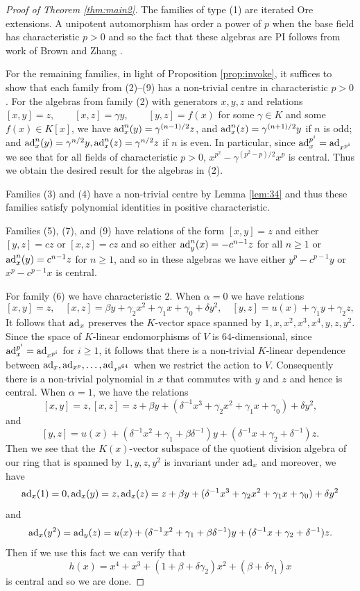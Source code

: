 \documentclass[a4paper,11pt,twoside,notitlepage,reqno]{amsart}
\theoremstyle{plain}
\numberwithin{thm}{section}
\theoremstyle{definition}
\begin{document}
\begin{proof}[Proof of Theorem \ref{thm:main2}]

The families of type (1) are iterated Ore extensions.  A unipotent automorphism has order a power of $p$ when the base field has characteristic $p>0$ and so the fact that these algebras are PI follows from work of Brown and Zhang \cite[Theorem 3.3]{BZ}. 

For the remaining families, in light of Proposition \ref{prop:invoke}, it suffices to show that each family from (2)--(9) has a non-trivial centre in characteristic $p>0$.
For the algebras from family (2) with generators $x,y,z$ and relations $[x,y]=z, \qquad [x,z]=\gamma y, \qquad [y,z]=f(x)$ for some $\gamma\in K$ and some $f(x)\in K[x]$, we have
${\rm ad}_x^n(y) = \gamma^{(n-1)/2} z$, and ${\rm ad}_x^n(z)=\gamma^{(n+1)/2}y$ if $n$ is odd; and ${\rm ad}_x^n(y)=\gamma^{n/2} y, {\rm ad}_x^n(z)=\gamma^{n/2} z$ if $n$ is even.
In particular, since ${\rm ad}_x^{p^i} = {\rm ad}_{x^{p^i}}$ we see that for all fields of characteristic $p>0$, $x^{p^2}-\gamma^{(p^2-p)/2} x^p$ is central.  Thus we obtain the desired result for the algebras in (2).


Families (3) and (4) have a non-trivial centre by Lemma \ref{lem:34} and thus these families satisfy polynomial identities in positive characteristic.

Families (5), (7), and (9) have relations of the form $[x,y]=z$ and either $[y,z]=c z$ or $[x,z]=cz$ and so either ${\rm ad}_y^n(x) = -c^{n-1} z$ for all $n\ge 1$ or ${\rm ad}_x^n(y)=c^{n-1}z$ for $n\ge 1$, and so in these algebras we have either $y^p - c^{p-1} y$ or $x^p-c^{p-1}x$ is central. 

For family (6) we have characteristic $2$. When $\alpha=0$ we have relations
$$[x,y]=z, \quad [x,z]= \beta y +  \gamma_2 x^2 + \gamma_1 x + \gamma_0 +\delta y^2,\quad [y,z]=u(x)+\gamma_1y +\gamma_2 z,$$
It follows that ${\rm ad}_x$ preserves the $K$-vector space spanned by $1, x, x^2, x^3, x^4, y, z, y^2$.  Since the space of $K$-linear endomorphisms of $V$ is $64$-dimensional, since ${\rm ad}_x^{p^i}={\rm ad}_{x^{p^i}}$ for $i\ge 1$, it follows that there is a non-trivial $K$-linear dependence between 
${\rm ad}_x, {\rm ad}_{x^p}, \ldots , {\rm ad}_{x^{p^{64}}}$ when we restrict the action to $V$.  Consequently there is a non-trivial polynomial in $x$ that commutes with $y$ and $z$ and hence is central. When $\alpha=1$, we have the relations
$$[x,y]=z, [x,z]=z + \beta y + (\delta^{-1} x^3+ \gamma_2 x^2 + \gamma_1 x + \gamma_0 ) +\delta y^2,$$
and
$$[y,z] = u(x) + (\delta^{-1} x^2+\gamma_1+\beta \delta^{-1})y + (\delta^{-1} x+\gamma_2+\delta^{-1})z.$$
Then we see that the $K(x)$-vector subspace of the quotient division algebra of our ring that is spanned by $1, y, z, y^2$ is invariant under ${\rm ad}_x$ and moreover, we have
$${\rm ad}_x(1)=0, {\rm ad}_x(y)=z, {\rm ad}_x(z)= z + \beta y + (\delta^{-1} x^3+ \gamma_2 x^2 + \gamma_1 x + \gamma_0 ) +\delta y^2$$
and $${\rm ad}_x(y^2) = {\rm ad}_y(z)=u(x) + (\delta^{-1} x^2+\gamma_1+\beta \delta^{-1})y + (\delta^{-1} x+\gamma_2+\delta^{-1})z.$$
Then if we use this fact we can verify that $$h(x)=x^4 + x^3 + (1+\beta+\delta\gamma_2)x^2 + (\beta+\delta\gamma_1)x$$ is central and so we are done.


\end{proof}
\end{document}
